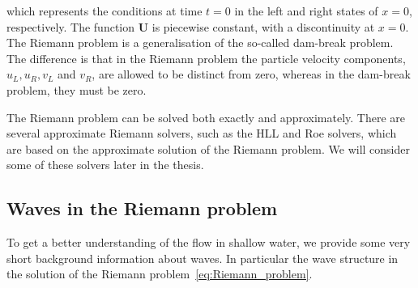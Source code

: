 which represents the conditions at time $t = 0$ in the left and right states of $x=0$, respectively.
The function $\mathbf{U}$ is piecewise constant, with a discontinuity at $x=0$.
The Riemann problem is a generalisation of the so-called dam-break problem.
The difference is that in the Riemann problem the particle velocity components, $u_L, u_R, v_L$ and $v_R$, are allowed to be distinct from zero, whereas in the dam-break problem, they must be zero.

The Riemann problem can be solved both exactly and approximately.
There are several approximate Riemann solvers, such as the HLL and Roe solvers, which are based on the approximate solution of the Riemann problem.
We will consider some of these solvers later in the thesis.

\subsection{Waves in the Riemann problem}
To get a better understanding of the flow in shallow water, we provide some very short background information about waves.
In particular the wave structure in the solution of the Riemann problem~\eqref{eq:Riemann_problem}.


